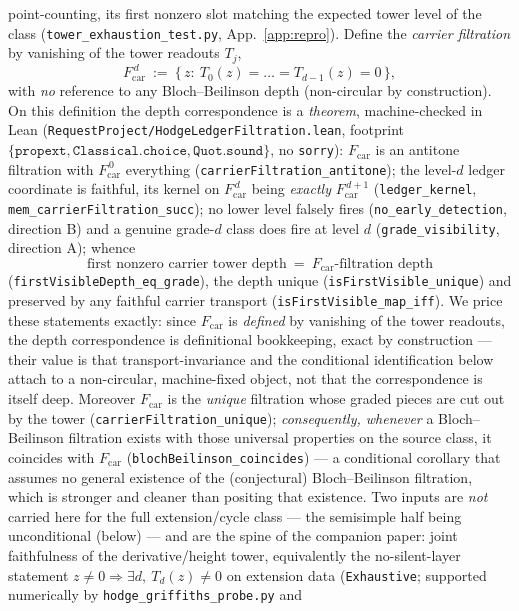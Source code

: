 \documentclass[11pt]{article}
\theoremstyle{definition}
\begin{document}
point-counting, its first nonzero slot matching the expected tower level of the class
(\texttt{tower\_exhaustion\_test.py}, App.~\ref{app:repro}). Define the \emph{carrier filtration} by
vanishing of the tower readouts $T_j$,
\[
  F_{\mathrm{car}}^{\,d}\ :=\ \{\,z:\ T_0(z)=\dots=T_{d-1}(z)=0\,\},
\]
with \emph{no} reference to any Bloch--Beilinson depth (non-circular by construction). On this
definition the depth correspondence is a \emph{theorem}, machine-checked in Lean
(\texttt{RequestProject/HodgeLedgerFiltration.lean}, footprint
$\{\texttt{propext},\texttt{Classical.choice},\texttt{Quot.sound}\}$, no \texttt{sorry}):
$F_{\mathrm{car}}$ is an antitone filtration with $F_{\mathrm{car}}^{\,0}$ everything
(\texttt{carrierFiltration\_antitone}); the level-$d$ ledger coordinate is faithful, its kernel on
$F_{\mathrm{car}}^{\,d}$ being \emph{exactly} $F_{\mathrm{car}}^{\,d+1}$ (\texttt{ledger\_kernel},
\texttt{mem\_carrierFiltration\_succ}); no lower level falsely fires (\texttt{no\_early\_detection},
direction B) and a genuine grade-$d$ class does fire at level $d$ (\texttt{grade\_visibility},
direction A); whence
\[
  \boxed{\ \text{first nonzero carrier tower depth}\ =\ F_{\mathrm{car}}\text{-filtration depth}\ }
\]
(\texttt{firstVisibleDepth\_eq\_grade}), the depth unique (\texttt{isFirstVisible\_unique}) and
preserved by any faithful carrier transport (\texttt{isFirstVisible\_map\_iff}). We price these statements
exactly: since $F_{\mathrm{car}}$ is \emph{defined} by vanishing of the tower readouts, the depth
correspondence is definitional bookkeeping, exact by construction --- their value is that
transport-invariance and the conditional identification below attach to a non-circular, machine-fixed
object, not that the correspondence is itself deep. Moreover
$F_{\mathrm{car}}$ is the \emph{unique} filtration whose graded pieces are cut out by the tower
(\texttt{carrierFiltration\_unique}); \emph{consequently, whenever} a Bloch--Beilinson filtration
exists with those universal properties on the source class, it coincides with $F_{\mathrm{car}}$
(\texttt{blochBeilinson\_coincides}) --- a conditional corollary that assumes no general existence of
the (conjectural) Bloch--Beilinson filtration, which is stronger and cleaner than positing that
existence. Two inputs are \emph{not} carried here for the full extension/cycle class --- the semisimple half
being unconditional (below) --- and are the spine of the companion paper: joint faithfulness of the
derivative/height tower, equivalently the no-silent-layer statement $z\ne0\Rightarrow\exists d,\ T_d(z)\ne0$
on extension data (\texttt{Exhaustive}; supported numerically by \texttt{hodge\_griffiths\_probe.py} and
\end{document}
